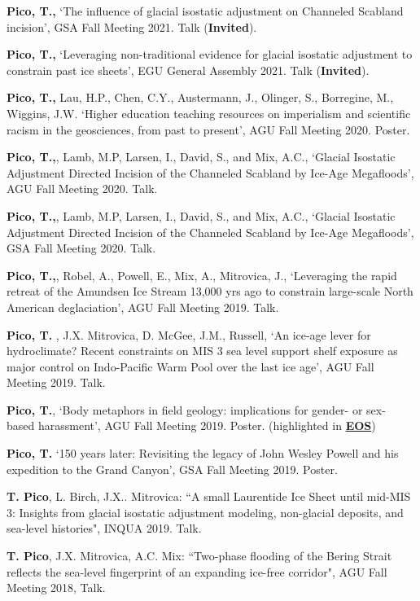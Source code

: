 \documentclass[margin,line]{res}
\begin{document}
\begin{resume}
{\bf Pico, T.,} `The influence of glacial isostatic adjustment on Channeled Scabland incision', GSA Fall Meeting 2021. Talk ({\bf  Invited}). 

{\bf Pico, T.,} `Leveraging non-traditional evidence for glacial isostatic adjustment to constrain past ice sheets', EGU General Assembly 2021. Talk ({\bf  Invited}). 

{\bf Pico, T.,} Lau, H.P., Chen, C.Y., Austermann, J., Olinger, S., Borregine, M., Wiggins, J.W. `Higher education teaching resources on imperialism and scientific racism in the geosciences, from past to present', AGU Fall Meeting 2020. Poster.

{\bf Pico, T.,}, Lamb, M.P, Larsen, I.,  David, S., and Mix, A.C., `Glacial Isostatic Adjustment Directed Incision of the Channeled Scabland by Ice-Age Megafloods', AGU Fall Meeting 2020. Talk. 

{\bf Pico, T.,}, Lamb, M.P, Larsen, I.,  David, S., and Mix, A.C., `Glacial Isostatic Adjustment Directed Incision of the Channeled Scabland by Ice-Age Megafloods', GSA Fall Meeting 2020. Talk. 

{\bf Pico, T.,},  Robel, A., Powell, E., Mix, A., Mitrovica, J., `Leveraging the rapid retreat of the Amundsen Ice Stream 13,000 yrs ago to constrain large-scale North American deglaciation', AGU Fall Meeting 2019. Talk.

{\bf Pico, T.} , J.X. Mitrovica, D. McGee, J.M., Russell, `An ice-age lever for hydroclimate? Recent constraints on MIS 3 sea level support shelf exposure as major control on Indo-Pacific Warm Pool over the last ice age', AGU Fall Meeting 2019. Talk.

{\bf Pico, T.}, `Body metaphors in field geology: implications for gender- or sex- based harassment', AGU Fall Meeting 2019.  Poster. (highlighted in {\bf \href{https://eos.org/articles/body-based-jargon-can-be-harassment-when-it-turns-sexual}{EOS}})

{\bf Pico, T.} `150 years later: Revisiting the legacy of John Wesley Powell and his expedition to the Grand Canyon', GSA Fall Meeting 2019. Poster.

{\bf T. Pico}, L. Birch, J.X.. Mitrovica: ``A small Laurentide Ice Sheet until mid-MIS 3: Insights from glacial isostatic adjustment modeling, non-glacial deposits, and sea-level histories", INQUA 2019. Talk.

{\bf T. Pico}, J.X. Mitrovica, A.C. Mix: ``Two-phase flooding of the Bering Strait reflects the sea-level fingerprint of an expanding ice-free corridor", AGU Fall Meeting 2018, Talk.


\end{resume}
\end{document}
